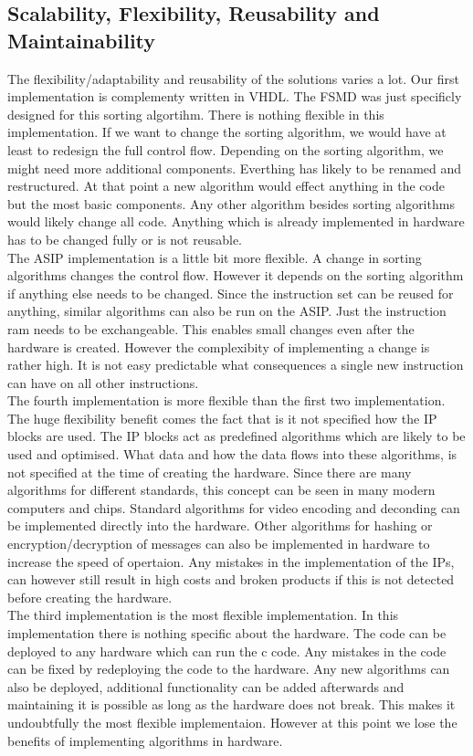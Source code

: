 \documentclass[conference]{IEEEtran}
\begin{document}
\subsection{Scalability, Flexibility, Reusability and Maintainability}
The flexibility/adaptability and reusability of the solutions varies a lot. Our first implementation is complementy written in VHDL. The FSMD was just specificly designed for this sorting algortihm. There is nothing flexible in this implementation. If we want to change the sorting algorithm, we would have at least to redesign the full control flow. Depending on the sorting algorithm, we might need more additional components. Everthing has likely to be renamed and restructured. At that point a new algorithm would effect anything in the code but the most basic components. Any other algorithm besides sorting algorithms would likely change all code. Anything which is already implemented in hardware has to be changed fully or is not reusable. \\
The ASIP implementation is a little bit more flexible. A change in sorting algorithms changes the control flow. However it depends on the sorting algorithm if anything else needs to be changed. Since the instruction set can be reused for anything, similar algorithms can also be run on the ASIP. Just the instruction ram needs to be exchangeable. This enables small changes even after the hardware is created. However the complexibity of implementing a change is rather high. It is not easy predictable what consequences a single new instruction can have on all other instructions. \\
The fourth implementation is more flexible than the first two implementation. The huge flexibility benefit comes the fact that is it not specified how the IP blocks are used. The IP blocks act as predefined algorithms which are likely to be used and optimised. What data and how the data flows into these algorithms, is not specified at the time of creating the hardware. Since there are many algorithms for different standards, this concept can be seen in many modern computers and chips. Standard algorithms for video encoding and deconding can be implemented directly into the hardware. Other algorithms for hashing or encryption/decryption of messages can also be implemented in hardware to increase the speed of opertaion. Any mistakes in the implementation of the IPs, can however still result in high costs and broken products if this is not detected before creating the hardware. \\
The third implementation is the most flexible implementation. In this implementation there is nothing specific about the hardware. The code can be deployed to any hardware which can run the c code. Any mistakes in the code can be fixed by redeploying the code to the hardware. Any new algorithms can also be deployed, additional functionality can be added afterwards and maintaining it is possible as long as the hardware does not break. This makes it undoubtfully the most flexible implementaion. However at this point we lose the benefits of implementing algorithms in hardware. \\
\end{document}
